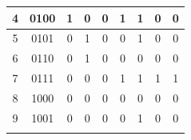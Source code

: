 \documentclass[12pt]{article}
\begin{document}
\begin{table}[h]
\begin{tabular}{ | c | c | c | c | c | c | c | c | c | }
  4                                                                      & 0100                                                                    & 1                             & 0                             & 0                             & 1                             & 1                             & 0                             & 0                             \\ \hline \rule{0em}{1.15em}
  5                                                                      & 0101                                                                    & 0                             & 1                             & 0                             & 0                             & 1                             & 0                             & 0                             \\ \hline \rule{0em}{1.15em}
  6                                                                      & 0110                                                                    & 0                             & 1                             & 0                             & 0                             & 0                             & 0                             & 0                             \\ \hline \rule{0em}{1.15em}
  7                                                                      & 0111                                                                    & 0                             & 0                             & 0                             & 1                             & 1                             & 1                             & 1                             \\ \hline \rule{0em}{1.15em}
  8                                                                      & 1000                                                                    & 0                             & 0                             & 0                             & 0                             & 0                             & 0                             & 0                             \\ \hline \rule{0em}{1.15em}
  9                                                                      & 1001                                                                    & 0                             & 0                             & 0                             & 0                             & 1                             & 0                             & 0                             \\ \hline \rule{0em}{1.15em}

\end{tabular}
\end{table}
\end{document}
